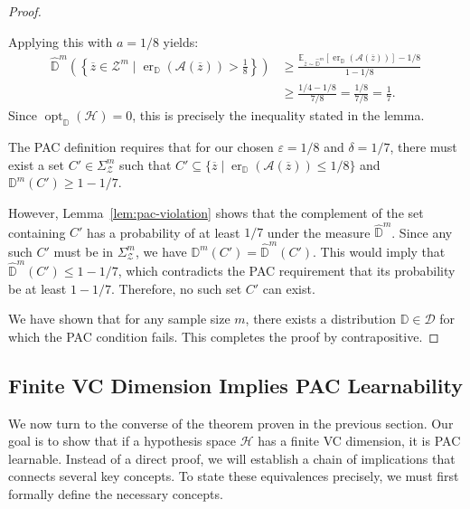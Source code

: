 \begin{proof}
\begin{subproof}
        Applying this with $a=1/8$ yields:
        \begin{align*}
            \widehat{\mathbb{D}}^m\left(\left\{ \overline{z} \in \mathcal{Z}^m \mid \operatorname{er}_{\mathbb{D}}(\mathcal{A}(\overline{z})) > \frac{1}{8} \right\}\right) &\ge \frac{\mathbb{E}_{\overline{z}\sim\widehat{\mathbb{D}}^m}[\operatorname{er}_{\mathbb{D}}(\mathcal{A}(\overline{z}))] - 1/8}{1 - 1/8} \\
            &\ge \frac{1/4 - 1/8}{7/8} = \frac{1/8}{7/8} = \frac{1}{7}.
        \end{align*}
        Since $\operatorname{opt}_{\mathbb{D}}(\mathcal{H}) = 0$, this is precisely the inequality stated in the lemma.
    \end{subproof}

    The PAC definition requires that for our chosen $\varepsilon=1/8$ and $\delta=1/7$, there must exist a set $C' \in \Sigma_{\mathcal{Z}}^m$ such that $C' \subseteq \{ \overline{z} \mid \operatorname{er}_{\mathbb{D}}(\mathcal{A}(\overline{z})) \le 1/8 \}$ and $\mathbb{D}^m(C') \ge 1 - 1/7$.

    However, Lemma~\ref{lem:pac-violation} shows that the complement of the set containing $C'$ has a probability of at least $1/7$ under the measure $\widehat{\mathbb{D}}^m$. Since any such $C'$ must be in $\Sigma_{\mathcal{Z}}^m$, we have $\mathbb{D}^m(C') = \widehat{\mathbb{D}}^m(C')$. This would imply that $\widehat{\mathbb{D}}^m(C') \le 1 - 1/7$, which contradicts the PAC requirement that its probability be at least $1 - 1/7$. Therefore, no such set $C'$ can exist.

    We have shown that for any sample size $m$, there exists a distribution $\mathbb{D} \in \mathcal{D}$ for which the PAC condition fails. This completes the proof by contrapositive.
\end{proof}

\subsection{Finite VC Dimension Implies PAC Learnability}

We now turn to the converse of the theorem proven in the previous section. Our goal is to show that if a hypothesis space $\mathcal{H}$ has a finite VC dimension, it is PAC learnable. Instead of a direct proof, we will establish a chain of implications that connects several key concepts. To state these equivalences precisely, we must first formally define the necessary concepts.

